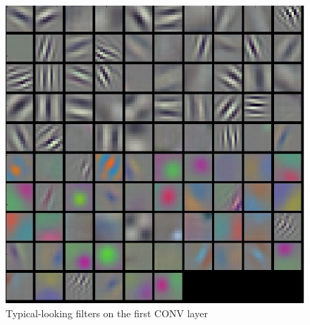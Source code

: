 \begin{figure}[H]
  \centering
    \includegraphics[scale=.3, angle=0]{Files/cnn_visaulize.jpeg}
    \caption[Typical-looking filters on the first CONV layer of a imagenet]{Typical-looking filters on the first CONV layer}
    \label{fig:visualize-cnn}
\end{figure}








